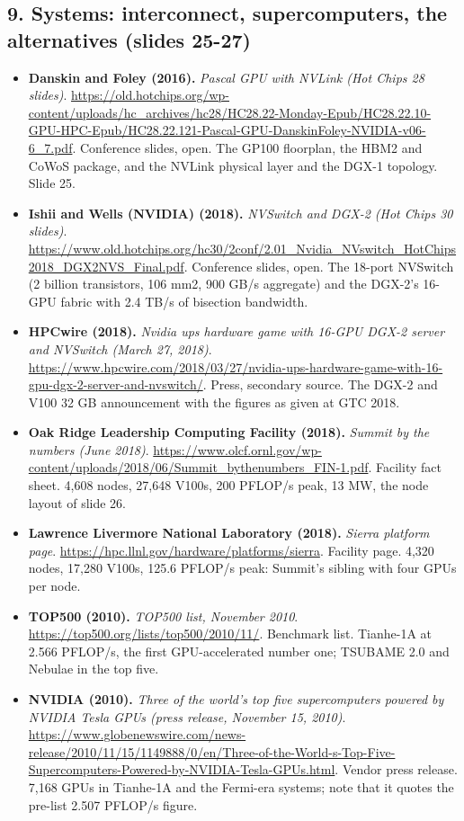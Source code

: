 \documentclass[11pt,letterpaper]{article}
\begin{document}
\subsection*{9. Systems: interconnect, supercomputers, the alternatives (slides 25-27)}
\begin{itemize}[leftmargin=1.2em,itemsep=3pt]\sloppy
\item \textbf{Danskin and Foley (2016).} \textit{Pascal GPU with NVLink (Hot Chips 28 slides)}. \url{https://old.hotchips.org/wp-content/uploads/hc_archives/hc28/HC28.22-Monday-Epub/HC28.22.10-GPU-HPC-Epub/HC28.22.121-Pascal-GPU-DanskinFoley-NVIDIA-v06-6_7.pdf}. Conference slides, open. The GP100 floorplan, the HBM2 and CoWoS package, and the NVLink physical layer and the DGX-1 topology. Slide 25.
\item \textbf{Ishii and Wells (NVIDIA) (2018).} \textit{NVSwitch and DGX-2 (Hot Chips 30 slides)}. \url{https://www.old.hotchips.org/hc30/2conf/2.01_Nvidia_NVswitch_HotChips2018_DGX2NVS_Final.pdf}. Conference slides, open. The 18-port NVSwitch (2 billion transistors, 106 mm2, 900 GB/s aggregate) and the DGX-2's 16-GPU fabric with 2.4 TB/s of bisection bandwidth.
\item \textbf{HPCwire (2018).} \textit{Nvidia ups hardware game with 16-GPU DGX-2 server and NVSwitch (March 27, 2018)}. \url{https://www.hpcwire.com/2018/03/27/nvidia-ups-hardware-game-with-16-gpu-dgx-2-server-and-nvswitch/}. Press, secondary source. The DGX-2 and V100 32 GB announcement with the figures as given at GTC 2018.
\item \textbf{Oak Ridge Leadership Computing Facility (2018).} \textit{Summit by the numbers (June 2018)}. \url{https://www.olcf.ornl.gov/wp-content/uploads/2018/06/Summit_bythenumbers_FIN-1.pdf}. Facility fact sheet. 4,608 nodes, 27,648 V100s, 200 PFLOP/s peak, 13 MW, the node layout of slide 26.
\item \textbf{Lawrence Livermore National Laboratory (2018).} \textit{Sierra platform page}. \url{https://hpc.llnl.gov/hardware/platforms/sierra}. Facility page. 4,320 nodes, 17,280 V100s, 125.6 PFLOP/s peak: Summit's sibling with four GPUs per node.
\item \textbf{TOP500 (2010).} \textit{TOP500 list, November 2010}. \url{https://top500.org/lists/top500/2010/11/}. Benchmark list. Tianhe-1A at 2.566 PFLOP/s, the first GPU-accelerated number one; TSUBAME 2.0 and Nebulae in the top five.
\item \textbf{NVIDIA (2010).} \textit{Three of the world's top five supercomputers powered by NVIDIA Tesla GPUs (press release, November 15, 2010)}. \url{https://www.globenewswire.com/news-release/2010/11/15/1149888/0/en/Three-of-the-World-s-Top-Five-Supercomputers-Powered-by-NVIDIA-Tesla-GPUs.html}. Vendor press release. 7,168 GPUs in Tianhe-1A and the Fermi-era systems; note that it quotes the pre-list 2.507 PFLOP/s figure.

\end{itemize}
\end{document}
